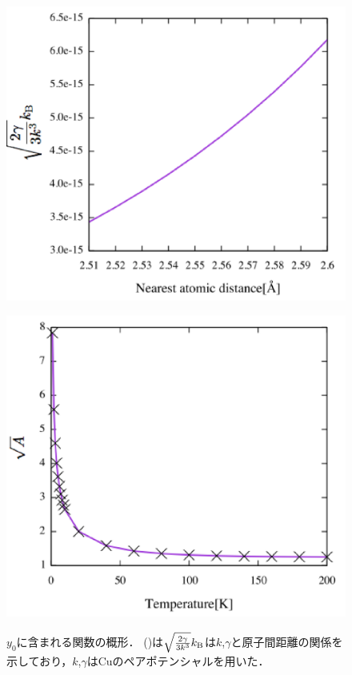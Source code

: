 \begin{figure}[htbp]
 \begin{minipage}[b]{0.5\linewidth}
  \centering
  \includegraphics[keepaspectratio, scale=0.42]
  {../image/y0_no_largea_label.eps}
  \subcaption{}\label{y0_heat1}
 \end{minipage}
 \begin{minipage}[b]{0.5\linewidth}
  \centering
  \includegraphics[keepaspectratio, scale=0.42]
  {../image/y0_largea_label.eps}
  \subcaption{}\label{y0_heat2}
 \end{minipage}
 \caption{$y_0$に含まれる関数の概形．
 ()は$\sqrt{\frac{2\gamma}{3k^3}}k_{\rm{B}}$は$k$,$\gamma$と原子間距離の関係を示しており，$k$,$\gamma$はCuのペアポテンシャルを用いた．
 }\label{fig:y0_heat}
\end{figure}

